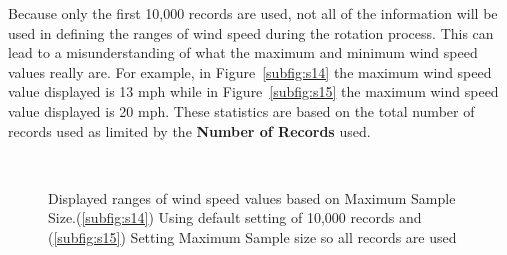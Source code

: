 \documentclass[12pt]{article}
\begin{document}
Because only the first 10,000 records are used, not all of the information will be used in defining the ranges of wind
speed during the rotation process. This can lead to a misunderstanding of what the maximum and minimum wind
speed values really are. For example, in Figure~\ref{subfig:s14} the maximum wind speed value displayed is 13 mph while in
Figure~\ref{subfig:s15} the maximum wind speed value displayed is 20 mph. These statistics are based on the total number of
records used as limited by the \textbf{Number of Records} used.

\begin{figure}[H]
\centering
{}\\
\caption{Displayed ranges of wind speed values based on Maximum Sample Size.(\ref{subfig:s14}) Using default setting
of 10,000 records and (\ref{subfig:s15}) Setting Maximum Sample size so all records are used}
\label{fig:Figure14_1}
\end{figure}
\end{document}
